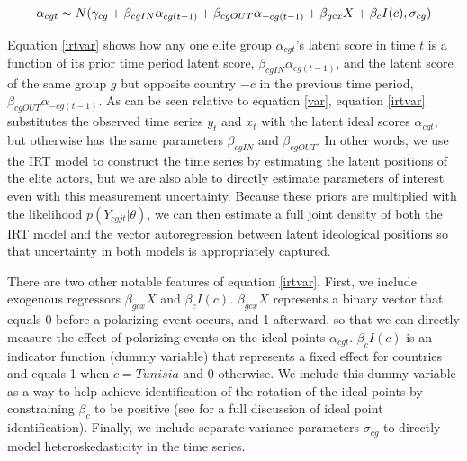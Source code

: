 \documentclass[12pt]{article}
\begin{document}
\begin{equation}\label{irtvar}
\alpha_{cgt}  \sim N(\gamma_{cg} + \beta_{cgIN}\alpha_{cg(t-1)} + \beta_{cgOUT}\alpha_{-cg(t-1)} + \beta_{gcx} X + \beta_c I(c),\sigma_{cg})\\
\end{equation}

Equation \ref{irtvar} shows how any one elite group $\alpha_{cgt}$'s latent score in time $t$ is a function of its prior time period latent score, $\beta_{cgIN}\alpha_{cg(t-1)}$, and the latent score of the same group $g$ but opposite country $-c$ in the previous time period, $\beta_{cgOUT}\alpha_{-cg(t-1)}$. As can be seen relative to equation \ref{var}, equation \ref{irtvar} substitutes the observed time series $y_t$ and $x_t$ with the latent ideal scores $\alpha_{cgt}$, but otherwise has the same parameters $\beta_{cgIN}$ and $\beta_{cgOUT}$. In other words, we use the IRT model to construct the time series by estimating the latent positions of the elite actors, but we are also able to directly estimate parameters of interest even with this measurement uncertainty. Because these priors are multiplied with the likelihood $p(Y_{cgjt}|\theta)$, we can then estimate a full joint density of both the IRT model and the vector autoregression between latent ideological positions so that uncertainty in both models is appropriately captured.

There are two other notable features of equation \ref{irtvar}. First, we include exogenous regressors $\beta_{gcx} X$ and $\beta_c I(c)$. $\beta_{gcx} X$ represents a binary vector that equals 0 before a polarizing event occurs, and 1 afterward, so that we can directly measure the effect of polarizing events on the ideal points $\alpha_{cgt}$. $\beta_c I(c)$ is an indicator function (dummy variable) that represents a fixed effect for countries and equals 1 when $c=Tunisia$ and 0 otherwise. We include this dummy variable as a way to help achieve identification of the rotation of the ideal points by constraining $\beta_c$ to be positive (see \parencite{gelman2005} for a full discussion of ideal point identification). Finally, we include separate variance parameters $\sigma_{cg}$ to directly model heteroskedasticity in the time series.
\end{document}

